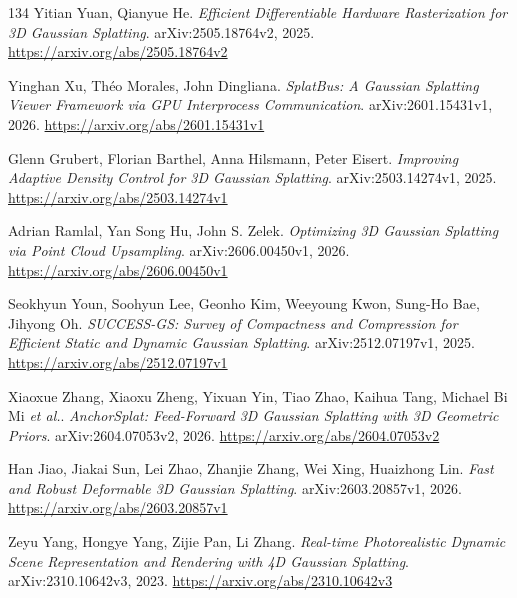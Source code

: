 \documentclass[11pt,a4paper]{article}
\begin{document}
\begin{thebibliography}{134}
Yitian Yuan, Qianyue He.
\newblock \emph{Efficient Differentiable Hardware Rasterization for 3D Gaussian Splatting}.
\newblock arXiv:2505.18764v2, 2025.
\newblock \url{https://arxiv.org/abs/2505.18764v2}

Yinghan Xu, Th\'{e}o Morales, John Dingliana.
\newblock \emph{SplatBus: A Gaussian Splatting Viewer Framework via GPU Interprocess Communication}.
\newblock arXiv:2601.15431v1, 2026.
\newblock \url{https://arxiv.org/abs/2601.15431v1}

Glenn Grubert, Florian Barthel, Anna Hilsmann, Peter Eisert.
\newblock \emph{Improving Adaptive Density Control for 3D Gaussian Splatting}.
\newblock arXiv:2503.14274v1, 2025.
\newblock \url{https://arxiv.org/abs/2503.14274v1}

Adrian Ramlal, Yan Song Hu, John S. Zelek.
\newblock \emph{Optimizing 3D Gaussian Splatting via Point Cloud Upsampling}.
\newblock arXiv:2606.00450v1, 2026.
\newblock \url{https://arxiv.org/abs/2606.00450v1}

Seokhyun Youn, Soohyun Lee, Geonho Kim, Weeyoung Kwon, Sung-Ho Bae, Jihyong Oh.
\newblock \emph{SUCCESS-GS: Survey of Compactness and Compression for Efficient Static and Dynamic Gaussian Splatting}.
\newblock arXiv:2512.07197v1, 2025.
\newblock \url{https://arxiv.org/abs/2512.07197v1}

Xiaoxue Zhang, Xiaoxu Zheng, Yixuan Yin, Tiao Zhao, Kaihua Tang, Michael Bi Mi \emph{et al.}.
\newblock \emph{AnchorSplat: Feed-Forward 3D Gaussian Splatting with 3D Geometric Priors}.
\newblock arXiv:2604.07053v2, 2026.
\newblock \url{https://arxiv.org/abs/2604.07053v2}

Han Jiao, Jiakai Sun, Lei Zhao, Zhanjie Zhang, Wei Xing, Huaizhong Lin.
\newblock \emph{Fast and Robust Deformable 3D Gaussian Splatting}.
\newblock arXiv:2603.20857v1, 2026.
\newblock \url{https://arxiv.org/abs/2603.20857v1}

Zeyu Yang, Hongye Yang, Zijie Pan, Li Zhang.
\newblock \emph{Real-time Photorealistic Dynamic Scene Representation and Rendering with 4D Gaussian Splatting}.
\newblock arXiv:2310.10642v3, 2023.
\newblock \url{https://arxiv.org/abs/2310.10642v3}

\end{thebibliography}
\end{document}
